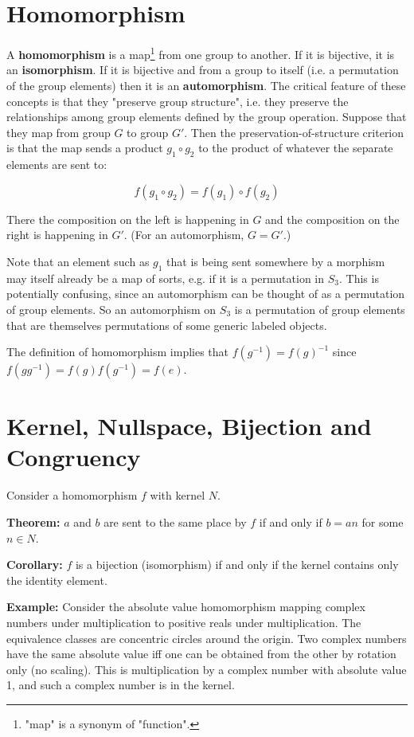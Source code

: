 \section{Homomorphism}
A \textbf{homomorphism} is a map\footnote{"map" is a synonym of "function".} from
one group to another. If it is bijective, it is an \textbf{isomorphism}. If it is
bijective and from a group to itself (i.e. a permutation of the group elements)
then it is an \textbf{automorphism}. The critical feature of these concepts is that
they "preserve group structure", i.e. they preserve the relationships among
group elements defined by the group operation. Suppose that they map from group
$G$ to group $G'$. Then the preservation-of-structure criterion is that the map
sends a product $g_1 \circ g_2$ to the product of whatever the separate
elements are sent to:

$$
f(g_1 \circ g_2) = f(g_1) \circ f(g_2)
$$

There the composition on the left is happening in $G$ and the composition on
the right is happening in $G'$. (For an automorphism, $G=G'$.)

Note that an element such as $g_1$ that is being sent somewhere by a morphism
may itself already be a map of sorts, e.g. if it is a permutation in
$S_3$. This is potentially confusing, since an automorphism can be thought of
as a permutation of group elements. So an automorphism on $S_3$ is a
permutation of group elements that are themselves permutations of some generic
labeled objects.

The definition of homomorphism implies that $f(g^{-1}) = f(g)^{-1}$ since
$f(gg^{-1}) = f(g)f(g^{-1}) = f(e)$.

\section{Kernel, Nullspace, Bijection and Congruency}

Consider a homomorphism $f$ with kernel $N$.

\textbf{Theorem:} $a$ and $b$ are sent to the same place by $f$ if and only if
$b = an$ for some $n \in N$.

\textbf{Corollary:} $f$ is a bijection (isomorphism) if and only if the kernel
contains only the identity element.

\textbf{Example:} Consider the absolute value homomorphism mapping complex numbers
under multiplication to positive reals under multiplication. The equivalence
classes are concentric circles around the origin. Two complex numbers have the
same absolute value iff one can be obtained from the other by rotation only (no
scaling). This is multiplication by a complex number with absolute value 1, and
such a complex number is in the kernel.

